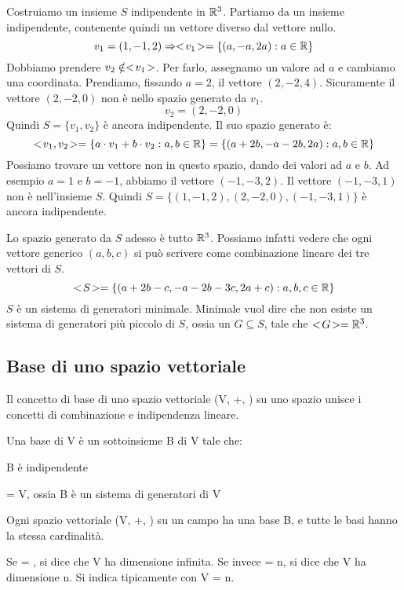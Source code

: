 Costruiamo un insieme $S$ indipendente in $\mathbb{R}^3$. Partiamo da un insieme indipendente, contenente quindi un vettore diverso dal vettore nullo.
\[
v_1 = (1, -1, 2) \Rightarrow <\!{v_1}\!> = \{ (a, -a, 2a) : a \in \mathbb{R} \}
\]
Dobbiamo prendere $v_2 \notin <\!{v_1}\!>$. Per farlo, assegnamo un valore ad $a$ e cambiamo una coordinata. Prendiamo, fissando $a = 2$, il vettore $(2, -2, 4)$. Sicuramente il vettore $(2, -2, 0)$ non \`e nello spazio generato da $v_1$.
\[
v_2 = (2, -2, 0)
\]
Quindi $S = \{ v_1, v_2 \}$ \`e ancora indipendente. Il suo spazio generato \`e:
\[
<\!{v_1, v_2}\!> = \{ a \cdot v_1 + b \cdot v_2 : a, b \in \mathbb{R} \} = 
\{ (a + 2b, -a -2b, 2a) : a, b \in \mathbb{R} \}
\]
Possiamo trovare un vettore non in questo spazio, dando dei valori ad $a$ e $b$. Ad esempio $a = 1$ e $b = -1$, abbiamo il vettore $(-1, -3, 2)$. Il vettore $(-1, -3, 1)$ non \`e nell'insieme $S$. Quindi $S = \{(1, -1, 2), (2, -2, 0), (-1, -3, 1) \}$ \`e ancora indipendente.

Lo spazio generato da $S$ adesso \`e tutto $\mathbb{R}^3$. Possiamo infatti vedere che ogni vettore generico $(a,b,c)$ si pu\`o scrivere come combinazione lineare dei tre vettori di $S$.
\[
<\!{S}\!> = \{ (a + 2b - c, -a -2b -3c, 2a + c) : a, b, c \in \mathbb{R} \}
\]
$S$ \`e un sistema di generatori minimale. Minimale vuol dire che non esiste un sistema di generatori pi\`u piccolo di $S$, ossia un $G \subseteq S$, tale che $<\!{G}\!> = \mathbb{R}^3$.

\subsection{Base di uno spazio vettoriale}

Il concetto di base di uno spazio vettoriale (V, +, \cdot) su uno spazio \field unisce i concetti di combinazione e indipendenza lineare.

\begin{defn}
Una base di V \`e un sottoinsieme B di V tale che:
\begin{description}
    \item B \`e indipendente
    \item {} = V, ossia B \`e un sistema di generatori di V
\end{description}
\end{defn}

\begin{theorem}
Ogni spazio vettoriale (V, +, \cdot) su un campo \field ha una base B, e tutte le basi hanno la stessa cardinalit\`a.
\end{theorem}
Se  = \infty, si dice che V ha dimensione infinita. Se invece  = n, si dice che V ha dimensione n. Si indica tipicamente con \dim V = n.

